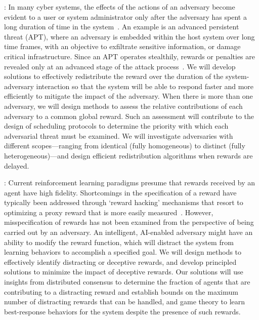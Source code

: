 \documentclass{NSF}
\begin{document}
:
In many cyber systems, the effects of the actions of an adversary become evident to a user or system administrator only after the adversary has spent a long duration of time in the system~\cite{brogi2016terminaptor, ahmad2019strategically, alshamrani2019survey, huang2019adaptive}. 
An example is an advanced persistent threat (APT), where an adversary is embedded within the host system over long time frames, with an objective to exfiltrate sensitive information, or damage critical infrastructure. 
Since an APT operates stealthily, rewards or penalties are revealed only at an advanced stage of the attack process~\cite{zhu2018multi, moothedath2020game, sahabandu2020quickest}. 
We will develop solutions to effectively redistribute the reward over the duration of the system-adversary interaction so that the system will be able to respond faster and more efficiently to mitigate the impact of the adversary. 
When there is more than one adversary, we will design methods to assess the relative contributions of each adversary to a common global reward. 
Such an assessment will contribute to the design of scheduling protocols to determine the priority with which each adversarial threat must be examined. 
We will investigate adversaries with different scopes---ranging from identical (fully homogeneous) to distinct (fully heterogeneous)---and design efficient redistribution algorithms when rewards are delayed.

:
Current reinforcement learning paradigms presume that rewards received by an agent have high fidelity. 
Shortcomings in the specification of a reward have typically been addressed through `reward hacking’ mechanisms that resort to optimizing a proxy reward that is more easily measured~\cite{talvitie2018learning, pan2021effects}. 
However, misspecification of rewards has not been examined from the perspective of being carried out by an adversary. 
An intelligent, AI-enabled adversary might have an ability to modify the reward function, which will distract the system from learning behaviors to accomplish a specified goal. 
We will design methods to effectively identify distracting or deceptive rewards, and develop principled solutions to minimize the impact of deceptive rewards. 
Our solutions will use insights from distributed consensus to determine the fraction of agents that are contributing to a distracting reward and establish bounds on the maximum number of distracting rewards that can be handled, and game theory to learn best-response behaviors for the system despite the presence of such rewards.
\end{document}
